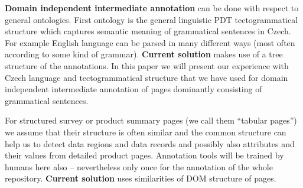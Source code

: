 \documentclass{www2009-submission}
\begin{document}
\textbf{Domain independent intermediate annotation} can be done with respect to general ontologies. First ontology is the general linguistic PDT tectogrammatical structure \cite{biblio:zkraceno_MiBeAnnotationtectogrammatical2006} which captures semantic meaning of grammatical sentences in Czech. 
For example English language can be parsed in many different ways (most often according to some kind of grammar). {\bf Current solution} makes use of a tree structure of the annotations. In this paper we will present our experience with Czech language and tectogrammatical structure that we have used for domain independent intermediate annotation of pages dominantly consisting of grammatical sentences. 

For structured survey or product summary pages (we call them ``tabular pages'') we assume that their structure is often similar and the common structure can help us to detect data regions and data records and possibly also attributes and their values from detailed product pages. Annotation tools will be trained by humans here also -- nevertheless only once for the annotation of the whole repository. {\bf Current solution} uses similarities of DOM structure of pages.






\end{document}
